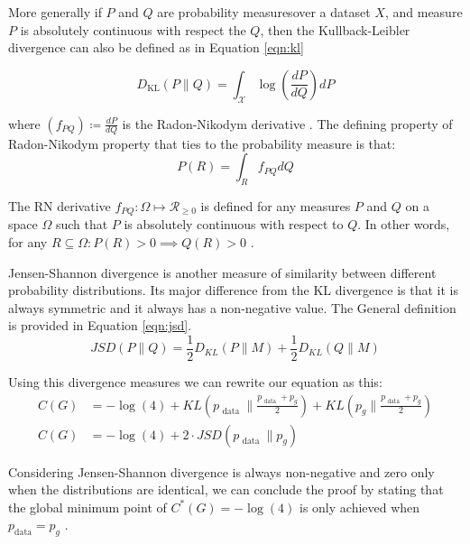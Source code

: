 More generally if $P$ and $Q$ are probability measures\footnotemark  over a dataset $X$, and measure
$P$ is absolutely continuous with respect the $Q$, then the Kullback-Leibler divergence can also be
defined as in Equation \ref{eqn:kl}

\begin{equation}
    \label{eqn:kl}
    D_{\mathrm{KL}}(P \| Q)=\int_{\mathcal{X}} \log \left(\frac{d P}{d Q}\right) d P
\end{equation}

where $(f_{PQ}) \coloneqq \frac{d P}{dQ} $ is the Radon-Nikodym derivative \cite{Bill86}. The defining property of
Radon-Nikodym property that ties to the probability measure is that:
\begin{equation}
    \label{eqn:radon}
    P(R) = \int_{R} f_{PQ} d Q
\end{equation}

The RN derivative $f_{PQ} : \Omega \mapsto \mathcal{R}_{\geq 0}$ is defined for any measures $P$ and
$Q$ on a space $\Omega$ such that $P$ is absolutely continuous with respect to $Q$. In other words,
for any $ R \subseteq  \Omega : P(R) > 0 \implies Q(R) > 0$  \cite{Bill86}.

Jensen-Shannon divergence is another measure of similarity between different probability
distributions.  Its major difference from the KL divergence is that it is always symmetric and it
always has a non-negative value. The General definition is provided in Equation \ref{eqn:jsd}.
\begin{equation}
    \label{eqn:jsd}
    J S D(P \| Q)=\frac{1}{2} D_{K L}(P \| M)+\frac{1}{2} D_{K L}(Q \| M)
\end{equation}

Using this divergence measures we can rewrite our equation as this:
\begin{align}
    \label{eqn:gan_eqaul}
    C(G)&=-\log (4)+K L\left(p_{\text { data }} \| \frac{p_{\text { data }}+p_{g}}{2}\right)+K L\left(p_{g} \| \frac{p_{\text { data }}+p_{g}}{2}\right) \\
    C(G)&=-\log (4)+2 \cdot J S D\left(p_{\text { data }} \| p_{g}\right)
\end{align}

Considering Jensen-Shannon divergence is always non-negative and zero only when the distributions
are identical, we can conclude the proof by stating that the global minimum point of $C^*(G) = -
\log(4)$ is only achieved when $p_{\text{data}} = p_g$ .

